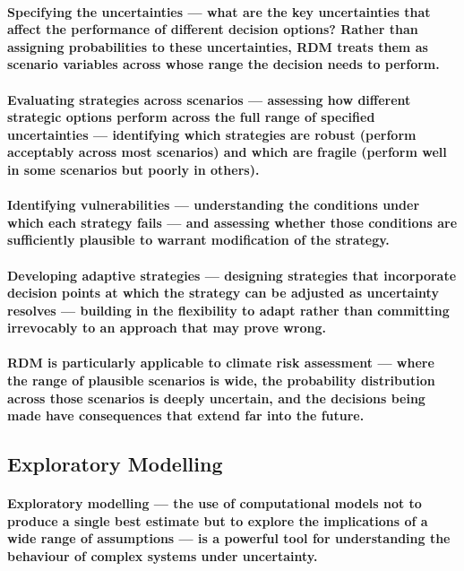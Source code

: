 \paragraph{\textbf{Specifying the uncertainties} — what are the key uncertainties that affect the performance of different decision options? Rather than assigning probabilities to these uncertainties, RDM treats them as scenario variables across whose range the decision needs to perform.}
\paragraph{\textbf{Evaluating strategies across scenarios} — assessing how different strategic options perform across the full range of specified uncertainties — identifying which strategies are robust (perform acceptably across most scenarios) and which are fragile (perform well in some scenarios but poorly in others).}
\paragraph{\textbf{Identifying vulnerabilities} — understanding the conditions under which each strategy fails — and assessing whether those conditions are sufficiently plausible to warrant modification of the strategy.}
\paragraph{\textbf{Developing adaptive strategies} — designing strategies that incorporate decision points at which the strategy can be adjusted as uncertainty resolves — building in the flexibility to adapt rather than committing irrevocably to an approach that may prove wrong.}
\paragraph{RDM is particularly applicable to climate risk assessment — where the range of plausible scenarios is wide, the probability distribution across those scenarios is deeply uncertain, and the decisions being made have consequences that extend far into the future.}

\subsection{Exploratory Modelling}
\paragraph{\textbf{Exploratory modelling} — the use of computational models not to produce a single best estimate but to explore the implications of a wide range of assumptions — is a powerful tool for understanding the behaviour of complex systems under uncertainty.}

